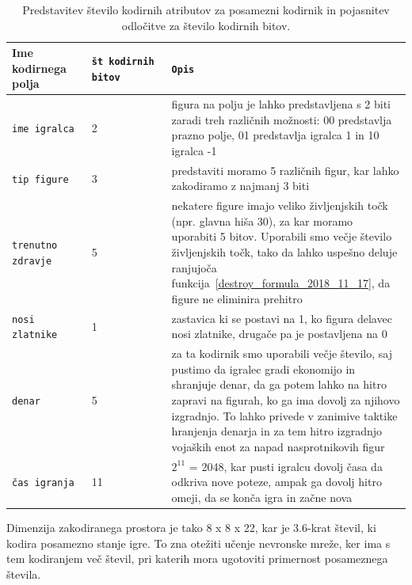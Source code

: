 \documentclass[a4paper, 12pt]{book}
\begin{document}
\begin{table}
	\begin{center}
		\begin{tabular}{p{0.2\linewidth}|p{0.2\linewidth}|p{0.6\linewidth}}
			Ime kodirnega polja      & {\tt št kodirnih bitov} & {\tt Opis} \\ \hline
			{\tt ime igralca}        & 2                       & figura na polju je lahko predstavljena s 2 biti zaradi treh različnih možnosti: 00 predstavlja prazno polje, 01 predstavlja igralca 1 in 10 igralca -1 \\
			{\tt tip figure}         & 3                       & predstaviti moramo 5 različnih figur, kar lahko zakodiramo z najmanj 3 biti\\
			{\tt trenutno zdravje}   & 5                       & nekatere figure imajo veliko življenjskih točk (npr. glavna hiša 30), za kar moramo uporabiti 5 bitov. 
																 Uporabili smo večje število življenjskih točk, tako da lahko uspešno deluje ranjujoča funkcija~\ref{destroy_formula_2018_11_17}, da figure ne eliminira prehitro \\
			{\tt nosi zlatnike}      & 1                       & zastavica ki se postavi na 1, ko figura delavec nosi zlatnike, drugače pa je postavljena na 0 \\
			{\tt denar}              & 5                       & za ta kodirnik smo uporabili večje število, saj pustimo da igralec gradi ekonomijo in shranjuje denar, da ga potem lahko na hitro zapravi na figurah, ko ga ima dovolj za njihovo izgradnjo.
																 To lahko privede v zanimive taktike hranjenja denarja in za tem hitro izgradnjo vojaških enot za napad nasprotnikovih figur \\
			{\tt čas igranja}        & 11                      & $2^{11}$ = 2048, kar pusti igralcu dovolj časa da odkriva nove poteze, ampak ga dovolj hitro omeji, da se konča igra in začne nova \\
		\end{tabular}
	\end{center}
	\caption{Predstavitev število kodirnih atributov za posamezni kodirnik in pojasnitev odločitve za število kodirnih bitov. }
	\label{tableEncodersOneHot}
\end{table}



Dimenzija zakodiranega prostora je tako 8 x 8 x 22, kar je 3.6-krat števil, ki kodira posamezno stanje igre.
To zna otežiti učenje nevronske mreže, ker ima s tem kodiranjem več števil, pri katerih mora ugotoviti primernost posameznega števila.
\end{document}
